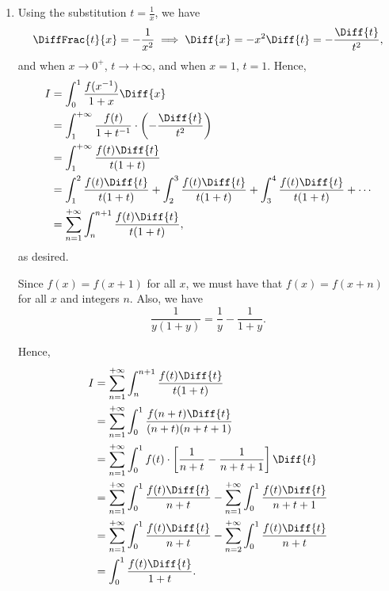 \Question{\currfilebase}

\begin{enumerate}
    \item Using the substitution \(t = \frac{1}{x}\), we have
          \[
              \DiffFrac{t}{x} = - \frac{1}{x^2} \implies \Diff{x} = - x^2 \Diff{t} = - \frac{\Diff{t}}{t^2},
          \]
          and when \(x \to 0^{+}\), \(t \to +\infty\), and when \(x = 1\), \(t = 1\). Hence,
          \begin{align*}
              I & = \int_{0}^{1} \frac{f(x^{-1})}{1 + x} \Diff{x}                                                                                                       \\
                & = \int_{1}^{+\infty} \frac{f(t)}{1 + t^{-1}} \cdot \left(- \frac{\Diff{t}}{t^2}\right)                                                                \\
                & = \int_{1}^{+\infty} \frac{f(t) \Diff{t}}{t (1 + t)}                                                                                                  \\
                & = \int_{1}^{2} \frac{f(t) \Diff{t}}{t (1 + t)} + \int_{2}^{3} \frac{f(t) \Diff{t}}{t (1 + t)} + \int_{3}^{4} \frac{f(t) \Diff{t}}{t (1 + t)} + \cdots \\
                & = \sum_{n = 1}^{+\infty} \int_{n}^{n + 1}\frac{f(t) \Diff{t}}{t (1 + t)},
          \end{align*}
          as desired.

          Since \(f(x) = f(x + 1)\) for all \(x\), we must have that \(f(x) = f(x + n)\) for all \(x\) and integers \(n\). Also, we have
          \[
              \frac{1}{y(1 + y)} = \frac{1}{y} - \frac{1}{1 + y}.
          \]

          Hence,
          \begin{align*}
              I & = \sum_{n = 1}^{+\infty} \int_{n}^{n + 1} \frac{f(t) \Diff{t}}{t (1 + t)}                                                               \\
                & = \sum_{n = 1}^{+\infty} \int_{0}^{1} \frac{f(n + t) \Diff{t}}{(n + t) (n + t + 1)}                                                     \\
                & = \sum_{n = 1}^{+\infty} \int_{0}^{1} f(t) \cdot \left[\frac{1}{n + t} - \frac{1}{n + t + 1}\right] \Diff{t}                            \\
                & = \sum_{n = 1}^{+\infty} \int_{0}^{1} \frac{f(t) \Diff{t}}{n + t} - \sum_{n = 1}^{+\infty} \int_{0}^{1} \frac{f(t) \Diff{t}}{n + t + 1} \\
                & = \sum_{n = 1}^{+\infty} \int_{0}^{1} \frac{f(t) \Diff{t}}{n + t} - \sum_{n = 2}^{+\infty} \int_{0}^{1} \frac{f(t) \Diff{t}}{n + t}     \\
                & = \int_{0}^{1} \frac{f(t) \Diff{t}}{1 + t}.
          \end{align*}


\end{enumerate}
